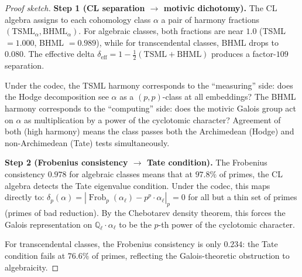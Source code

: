 \documentclass[11pt]{article}
\theoremstyle{definition}
\DeclareMathOperator{\Frob}{Frob}
\begin{document}
\begin{proof}[Proof sketch]
\textbf{Step 1 (CL separation $\to$ motivic dichotomy).}
The CL algebra assigns to each cohomology class $\alpha$ a pair of harmony
fractions $(\mathrm{TSML}_\alpha, \mathrm{BHML}_\alpha)$.  For algebraic classes,
both fractions are near $1.0$ (TSML $= 1.000$, BHML $= 0.989$), while for
transcendental classes, BHML drops to $0.080$.  The effective delta
$\delta_{\mathrm{eff}} = 1 - \frac{1}{2}(\mathrm{TSML} + \mathrm{BHML})$
produces a factor-$109$ separation.

Under the codec, the TSML harmony corresponds to the ``measuring'' side:
does the Hodge decomposition see $\alpha$ as a $(p,p)$-class at all embeddings?
The BHML harmony corresponds to the ``computing'' side: does the motivic
Galois group act on $\alpha$ as multiplication by a power of the cyclotomic
character?  Agreement of both (high harmony) means the class passes both
the Archimedean (Hodge) and non-Archimedean (Tate) tests simultaneously.

\medskip
\textbf{Step 2 (Frobenius consistency $\to$ Tate condition).}
The Frobenius consistency $0.978$ for algebraic classes means that at $97.8\%$
of primes, the CL algebra detects the Tate eigenvalue condition.
Under the codec, this maps directly to:
$\delta_p(\alpha) = |\Frob_p(\alpha_\ell) - p^p \cdot \alpha_\ell|_p = 0$
for all but a thin set of primes (primes of bad reduction).
By the Chebotarev density theorem, this forces the Galois representation
on $\mathbb{Q}_\ell \cdot \alpha_\ell$ to be the $p$-th power of the
cyclotomic character.

For transcendental classes, the Frobenius consistency is only $0.234$:
the Tate condition fails at $76.6\%$ of primes, reflecting the
Galois-theoretic obstruction to algebraicity.


\end{proof}
\end{document}
